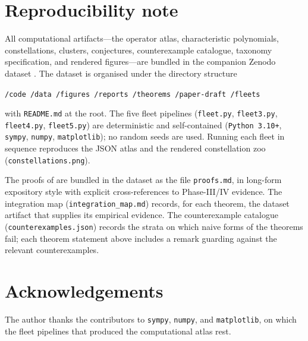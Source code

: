 \documentclass[aip,jmp,preprint,amsmath,amssymb,nofootinbib,floatfix]{revtex4-2}
\theoremstyle{plain}
\theoremstyle{definition}
\theoremstyle{remark}
\begin{document}
\section{Reproducibility note}\label{sec:reproducibility}

All computational artifacts---the operator atlas, characteristic
polynomials, constellations, clusters, conjectures, counterexample
catalogue, taxonomy specification, and rendered figures---are bundled in
the companion Zenodo dataset \cite{wkb_dataset_v1}. The dataset is
organised under the directory structure
\begin{center}
\texttt{/code\ /data\ /figures\ /reports\ /theorems\ /paper-draft\ /fleets}
\end{center}
with \texttt{README.md} at the root. The five fleet pipelines
(\texttt{fleet.py}, \texttt{fleet3.py}, \texttt{fleet4.py},
\texttt{fleet5.py}) are deterministic and self-contained
(\texttt{Python 3.10+}, \texttt{sympy}, \texttt{numpy},
\texttt{matplotlib}); no random seeds are used. Running each fleet in
sequence reproduces the JSON atlas and the rendered constellation zoo
(\texttt{constellations.png}).

The proofs of 
are bundled in the dataset as the file \texttt{proofs.md}, in long-form
expository style with explicit cross-references to Phase-III/IV evidence.
The integration map (\texttt{integration\_map.md}) records, for each
theorem, the dataset artifact that supplies its empirical evidence. The
counterexample catalogue (\texttt{counterexamples.json}) records the
strata on which naive forms of the theorems fail; each theorem statement
above includes a remark guarding against the relevant counterexamples.

\section*{Acknowledgements}\label{sec:ack}

The author thanks the contributors to \texttt{sympy}, \texttt{numpy},
and \texttt{matplotlib}, on which the fleet pipelines that produced
the computational atlas rest.
\end{document}
